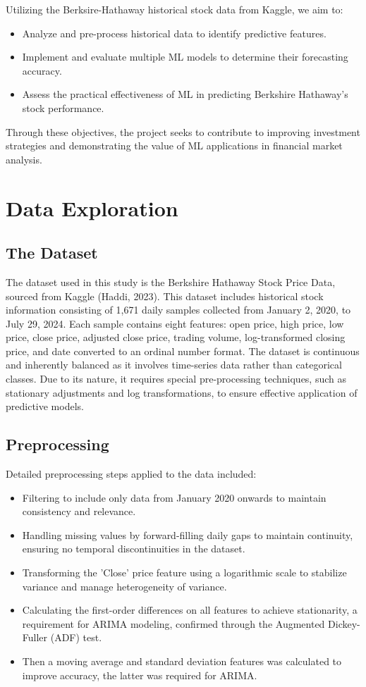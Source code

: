 \documentclass[conference]{IEEEtran}
\begin{document}
Utilizing the Berksire-Hathaway historical stock data from Kaggle, we aim to:
\begin{itemize}
    \item Analyze and pre-process historical data to identify predictive features.
    \item Implement and evaluate multiple ML models to determine their forecasting accuracy.
    \item Assess the practical effectiveness of ML in predicting Berkshire Hathaway’s stock performance.
\end{itemize}

Through these objectives, the project seeks to contribute to improving investment strategies and demonstrating the value of ML applications in financial market analysis.

\section{Data Exploration}

\subsection{The Dataset}

The dataset used in this study is the Berkshire Hathaway Stock Price Data, sourced from Kaggle (Haddi, 2023). This dataset includes historical stock information consisting of 1,671 daily samples collected from January 2, 2020, to July 29, 2024. Each sample contains eight features: open price, high price, low price, close price, adjusted close price, trading volume, log-transformed closing price, and date converted to an ordinal number format. The dataset is continuous and inherently balanced as it involves time-series data rather than categorical classes. Due to its nature, it requires special pre-processing techniques, such as stationary adjustments and log transformations, to ensure effective application of predictive models.

\subsection{Preprocessing}
Detailed preprocessing steps applied to the data included:
\begin{itemize}
    \item Filtering to include only data from January 2020 onwards to maintain consistency and relevance.
    \item Handling missing values by forward-filling daily gaps to maintain continuity, ensuring no temporal discontinuities in the dataset.
    \item Transforming the 'Close' price feature using a logarithmic scale to stabilize variance and manage heterogeneity of variance.
    \item Calculating the first-order differences on all features to achieve stationarity, a requirement for ARIMA modeling, confirmed through the Augmented Dickey-Fuller (ADF) test.
    \item Then a moving average and standard deviation features was calculated to improve accuracy, the latter was required for ARIMA.
\end{itemize}
\end{document}
